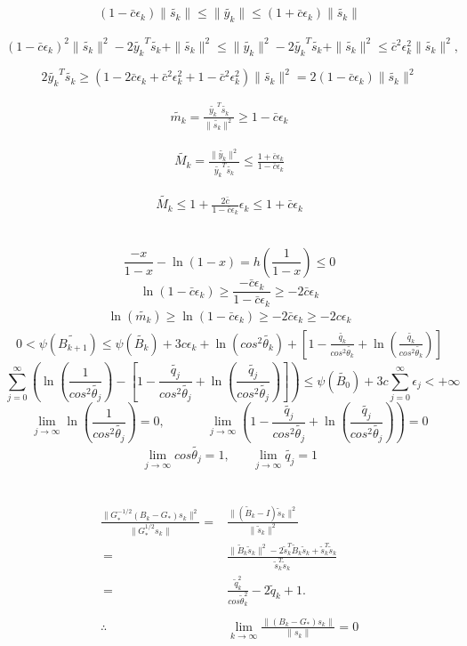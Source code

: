 \documentclass[12pt]{article}
\newcommand{\noi}{\noindent}
\newcommand{\bea}{\begin{eqnarray}}
\newcommand{\eea}{\end{eqnarray}}
\newcommand{\beas}{\begin{eqnarray*}}
\newcommand{\eeas}{\end{eqnarray*}}
\begin{document}
\bea  \label{6.55}
(1 - \bar{c} \epsilon_k) \| \tilde{s_{k}} \| \leq \| \tilde{y_{k}} \| \leq (1 + \bar{c} \epsilon_k) \| \tilde{s_{k}} \|
\eea

\[
  (1 - \bar{c} \epsilon_k)^2 \| \tilde{s_{k}} \|^2 - 2 \tilde{y_{k}}^T \tilde{s_{k}} + \| \tilde{s_{k}} \|^2 \leq \| \tilde{y_{k}} \|^2 - 2 \tilde{y_{k}}^T \tilde{s_{k}} +  \| \tilde{s_{k}} \|^2 \leq \bar{c}^2 \epsilon_{k}^2 \| \tilde{s_{k}} \|^2,
\]

\[
2 \tilde{y_{k}}^T \tilde{s_{k}} \geq (1 - 2 \bar{c} \epsilon_k + \bar{c}^2 \epsilon_{k}^2 + 1 - \bar{c}^2 \epsilon_{k}^2) \| \tilde{s_{k}} \|^2 = 2 (1 - \bar{c} \epsilon_k)\| \tilde{s_{k}} \|^2 
\]

\bea  \label{6.56}
\tilde{m_{k}} = \frac{\tilde{y_{k}}^T  \tilde{s_{k}}}{\| \tilde{s_{k}} \|^2 } \geq 1 - \bar{c} \epsilon_k
\eea

\bea  \label{6.57}
\tilde{M_{k}} = \frac{\| \tilde{y_{k}} \|^2 }{\tilde{y_{k}}^T  \tilde{s_{k}}} \leq \frac{1 + \bar{c} \epsilon_k}{1 - \bar{c} \epsilon_k}
\eea

\bea  \label{6.58}
\tilde{M_{k}} \leq 1 + \frac{2 \bar{c}}{1 - \bar{c} \epsilon_k} \epsilon_k \leq 1 + \bar{c} \epsilon_k
\eea



\noi{\bf 3}
\\
\[
\frac{-x}{1-x}-\ln(1-x)=h\left(\frac{1}{1-x}\right)\leq 0
\]
\[
\ln(1-\bar{c}\epsilon_k) \geq \frac{-\bar{c}\epsilon_k}{1-\bar{c}\epsilon_k} \geq -2\bar{c}\epsilon_k
\]
\bea \label{6.59}
\ln( \tilde{m_k} )\geq \ln(1-\bar{c}\epsilon_k) \geq -2\bar{c}\epsilon_k \geq -2c\epsilon_k
\eea
\bea \label{6.60}
0<\psi(\tilde{B_{k+1}}) \leq \psi(\tilde{B_{k}}) + 3c\epsilon_k + \ln(cos^2\tilde{\theta_k} )+ \left[ 1- \frac{\tilde{q_k}}{cos^2\tilde{\theta_k}} + \ln\left(\frac{\tilde{q_k}}{cos^2\tilde{\theta_k}}\right) \right]
\eea
\[
\sum\limits_{j=0}^\infty \left(\ln\left(\frac{1}{cos^2\tilde{\theta_j}}\right) - \left[ 1- \frac{\tilde{q_j}}{cos^2\tilde{\theta_j}} + \ln\left(\frac{\tilde{q_j}}{cos^2\tilde{\theta_j}}\right) \right]\right) \leq \psi(\tilde{B_0})+3c\sum\limits_{j=0}^\infty \epsilon_j < +\infty
\]
\[
\lim_{j\to\infty} \ln\left( \frac{1}{cos^2\tilde{\theta_j}}\right)=0, \ \ \ \ \ \ \ \ \ \ \ \ \ \ \ 
\lim_{j\to\infty} \left( 1- \frac{\tilde{q_j}}{cos^2\tilde{\theta_j}} + \ln\left(\frac{\tilde{q_j}}{cos^2\tilde{\theta_j}} \right)\right) = 0
\]
\bea \label{6.61}
\lim_{j\to\infty} cos\tilde{\theta_j}=1,  \ \ \ \ \ \ \ \ 
\lim_{j\to\infty} \tilde{q_j}=1
\eea



\noi{\bf 4}
\\


\beas
\frac{ \| G_{*} ^{-1/2} (B_k - G_{*}) s_k \|^2 }{ \|  G_{*} ^{1/2} s_k \|} =& \frac{ \| (\tilde{B}_{k} - I) \tilde{s}_{k} \|^2 }{ \|  \tilde{s}_{k} \|^2} \\
\ =& \frac{ \| \tilde{B}_{k} \tilde{s}_{k} \|^2 - 2 \tilde{s}_{k}^T \tilde{B}_{k} \tilde{s}_{k} + \tilde{s}_{k}^T \tilde{s}_{k} }{ \tilde{s}_{k}^T  \tilde{s}_{k}} \\
\ =& \frac{\tilde{q}_{k} ^2 }{ cos \tilde{\theta}_{k}^2 } - 2 \tilde{q}_{k} + 1.\\ \\ 
 \therefore\ & \lim_{k \to \infty} \frac{\| (B_k - G_{*}) s_k \|}{\| s_k \|} = 0
\eeas
\end{document}

